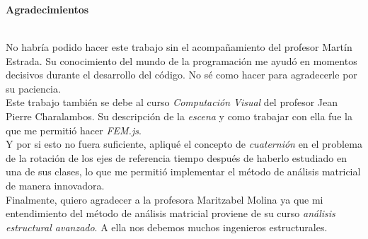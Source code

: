\newpage{\pagestyle{empty}\cleardoublepage}

\newpage
\thispagestyle{empty} \textbf{}\normalsize
\\\\\\%
\textbf{\LARGE Agradecimientos}
\\

No habría podido hacer este trabajo sin el acompañamiento del profesor Martín Estrada. Su conocimiento del mundo de la programación me ayudó en momentos decisivos durante el desarrollo del código. No sé como hacer para agradecerle por su paciencia.\\

Este trabajo también se debe al curso \emph{Computación Visual} del profesor Jean Pierre Charalambos. Su descripción de la \emph{escena} y como trabajar con ella fue la que me permitió hacer \emph{FEM.js}.\\

Y por si esto no fuera suficiente, apliqué el concepto de \emph{cuaternión} en el problema de la rotación de los ejes de referencia tiempo después de haberlo estudiado en una de sus clases, lo que me permitió implementar el método de análisis matricial de manera innovadora.\\

Finalmente, quiero agradecer a la profesora Maritzabel Molina ya que mi entendimiento del método de análisis matricial proviene de su curso \emph{análisis estructural avanzado}. A ella nos debemos muchos ingenieros estructurales.

\newpage{\pagestyle{empty}\cleardoublepage}

\newpage

